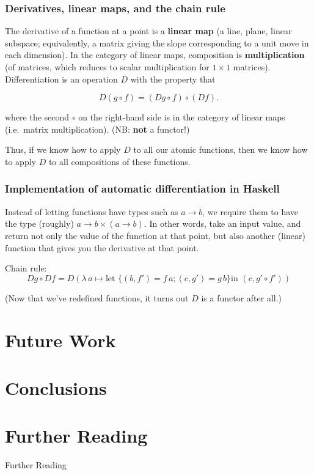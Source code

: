 \documentclass[10pt]{beamer}
\newcommand{\lamf}[2]{\ensuremath{\lambda\, #1 \mapsto #2}}
\theoremstyle{definition}
\theoremstyle{remark}
\numberwithin{equation}{section}
\begin{document}
\begin{frame}[fragile]
  \frametitle{Derivatives, linear maps, and the chain rule}
  
  The derivative of a function at a point is a \textbf{linear map} (a line,
  plane, linear subspace; equivalently, a matrix giving the slope corresponding
  to a unit move in each dimension). In the category of linear maps,
  composition is \textbf{multiplication} (of matrices, which reduces to scalar
  multiplication for $1 \times 1$ matrices). Differentiation is an operation $D$ with the property that

  \[
    D(g \circ f) = (D g \circ f) \circ (D f).
  \]

  where the second $\circ$ on the right-hand side is in the category of linear maps
  (i.e.\ matrix multiplication). {\small (NB: \textbf{not} a functor!)}

  Thus, if we know how to apply $D$ to all our atomic functions, then we know
  how to apply $D$ to all compositions of these functions.
  
\end{frame}

\begin{frame}[fragile]
  \frametitle{Implementation of automatic differentiation in Haskell}

  Instead of letting functions have types such as $a \rightarrow b$, we require them to
  have the type (roughly) $a \rightarrow b \times (a \rightarrow b)$. In other words, take an input
  value, and return not only the value of the function at that point, but also
  another (linear) function that gives you the derivative at that point.

  Chain rule:
  \[
    Dg \circ Df = D (\lamf{a}{\text{let } \{(b, f') = f\,a; (c,g') = g\,b\} \text{
        in }
    (c, g' \circ f')})
\]

(Now that we've redefined functions, it turns out $D$ is a functor after all.)
\end{frame}

\section{Future Work} %

\section{Conclusions} %

\section{Further Reading}

\begin{frame}[fragile]{Further Reading}

  \nocite{elkins_calculating_2009}
  \nocite{diel:blog}
  \nocite{milewski2014}

  
  

\end{frame}
\end{document}
